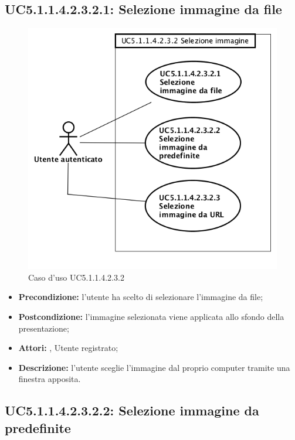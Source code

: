\subsection{ UC5.1.1.4.2.3.2.1: Selezione immagine da file}

\begin{figure}[h]
	\begin{center}
	\includegraphics[scale=0.4]{diagram/UC5-1-1-4-2-3-2.png}
	\caption{Caso d'uso UC5.1.1.4.2.3.2}
	\end{center}
\end{figure}
\begin{itemize}
	\item \textbf{Precondizione:} l’utente ha scelto di selezionare l’immagine da file;
	\item \textbf{Postcondizione:} l’immagine selezionata viene applicata allo sfondo della presentazione;
	\item \textbf{Attori:} , Utente registrato;
	\item \textbf{Descrizione:} l’utente sceglie l’immagine dal proprio computer tramite una finestra apposita.
\end{itemize}
\subsection{ UC5.1.1.4.2.3.2.2: Selezione immagine da predefinite}

